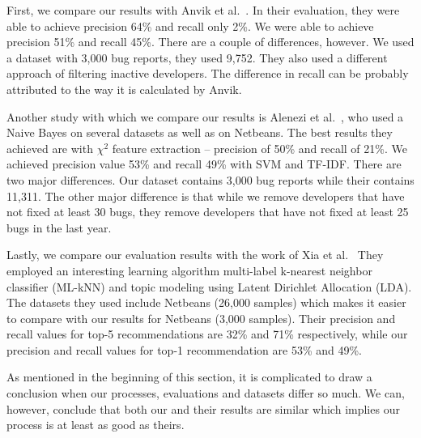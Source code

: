 First, we compare our results with Anvik et al.~\cite{Anvik2006}. In their evaluation, they were able to achieve precision 64\% and recall only 2\%. We were able to achieve precision 51\% and recall 45\%. There are a couple of differences, however. We used a dataset with 3,000 bug reports, they used 9,752. They also used a different approach of filtering inactive developers. The difference in recall can be probably attributed to the way it is calculated by Anvik.

Another study with which we compare our results is Alenezi et al.~\cite{Alenezi2013}, who used a Naive Bayes on several datasets as well as on Netbeans. The best results they achieved are with $\chi^2$ feature extraction -- precision of 50\% and recall of 21\%. We achieved precision value 53\% and recall 49\% with SVM and TF-IDF. There are two major differences. Our dataset contains 3,000 bug reports while their contains 11,311. The other major difference is that while we remove developers that have not fixed at least 30 bugs, they remove developers that have not fixed at least 25 bugs in the last year.

Lastly, we compare our evaluation results with the work of Xia et al.~\cite{Xia2015} They employed an interesting learning algorithm multi-label k-nearest neighbor classifier (ML-kNN) and topic modeling using Latent Dirichlet Allocation (LDA). The datasets they used include Netbeans (26,000 samples) which makes it easier to compare with our results for Netbeans (3,000 samples). Their precision and recall values for top-5 recommendations are 32\% and 71\% respectively, while our precision and recall values for top-1 recommendation are 53\% and 49\%.

As mentioned in the beginning of this section, it is complicated to draw a conclusion when our processes, evaluations and datasets differ so much. We can, however, conclude that both our and their results are similar which implies our process is at least as good as theirs. 